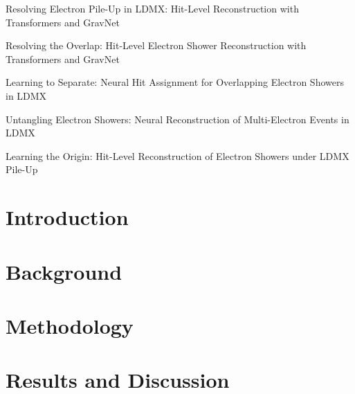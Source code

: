 Resolving Electron Pile-Up in LDMX: Hit-Level Reconstruction with Transformers and GravNet

Resolving the Overlap: Hit-Level Electron Shower Reconstruction with Transformers and GravNet

Learning to Separate: Neural Hit Assignment for Overlapping Electron Showers in LDMX

Untangling Electron Showers: Neural Reconstruction of Multi-Electron Events in LDMX

Learning the Origin: Hit-Level Reconstruction of Electron Showers under LDMX Pile-Up




\clearpage
\tableofcontents

\clearpage
{} %
%

\newpage
\section{Introduction}


\newpage
\section{Background}


%

\section{Methodology}
\label{sec:method}


\section{Results and Discussion}


